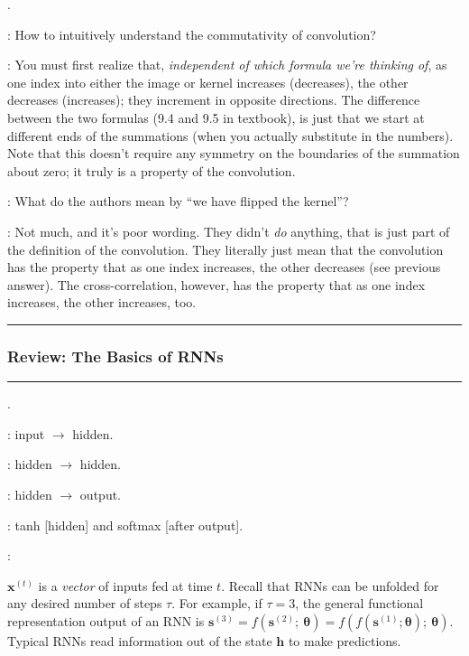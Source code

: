 \documentclass[11pt]{article}
\newcommand\myspace[1][]{\vspace{#1\bigskipamount}}
\newcommand\p{\Needspace{10\baselineskip} \noindent}
\newcommand\subsub[1]{\Needspace{15\baselineskip}\hrule\subsubsection{#1}\hrule}
\newcommand\QA[2]{\item \red{Q}: #1
	\begin{compactitem}
		\item \green{A}: #2
	\end{compactitem}}
\begin{document}
\myspace
\p {}. 
\begin{compactitem}
	\QA{How to intuitively understand the commutativity of convolution?}{You must first realize that, \textit{independent of which formula we're thinking of}, as one index into either the image or kernel increases (decreases), the other decreases (increases); they increment in opposite directions. The difference between the two formulas (9.4 and 9.5 in textbook), is just that we start at different ends of the summations (when you actually substitute in the numbers). Note that this doesn't require any symmetry on the boundaries of the summation about zero; it truly is a property of the convolution.}
	
	\QA{What do the authors mean by ``we have flipped the kernel''?}{Not much, and it's poor wording. They didn't \textit{do} anything, that is just part of the definition of the convolution. They literally just mean that the convolution has the property that as one index increases, the other decreases (see previous answer). The cross-correlation, however, has the property that as one index increases, the other increases, too.}
\end{compactitem}
























\newcommand\var[3][]{\bm{#2}^{(#3)}_{#1}}
\subsub{Review: The Basics of RNNs}
\p {}. 
\begin{compactitem}
	\item {}: input $\rightarrow$ hidden.
	\item {}: hidden $\rightarrow$ hidden.
	\item {}: hidden $\rightarrow$ output.
	\item {}: tanh [hidden] and softmax [after output].
	\item {}: \begin{scriptsize}
		$\bm x^{(t)}$ is a \textit{vector} of inputs fed at time $t$. Recall that RNNs can be unfolded for any desired number of steps $\tau$. For example, if $\tau = 3$, the general functional representation output of an RNN is $\var{s}{3} = f(\var{s}{2}; ~ \bm \theta )=f(f(\var{s}{1}; \bm \theta); ~ \bm \theta)$. Typical RNNs read information out of the state $\bm h$ to make predictions. 
	\end{scriptsize}
\end{compactitem}
\end{document}
